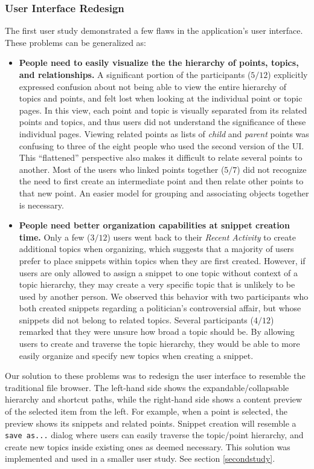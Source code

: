 \documentclass{sig-alt-release2}
\begin{document}
\subsubsection{User Interface Redesign}
The first user study demonstrated a few flaws in the application's user interface. These problems can be generalized as:
\begin{itemize}
	\item \textbf{People need to easily visualize the the hierarchy of points, topics, and relationships.} A significant portion of the participants ($5/12$) explicitly expressed confusion about not being able to view the entire hierarchy of topics and points, and felt lost when looking at the individual point or topic pages. In this view, each point and topic is visually separated from its related points and topics, and thus users did not understand the significance of these individual pages. Viewing related points as lists of {\it child} and {\it parent} points was confusing to three of the eight people who used the second version of the UI. This ``flattened'' perspective also makes it difficult to relate several points to another. Most of the users who linked points together ($5/7$) did not recognize the need to first create an intermediate point and then relate other points to that new point. An easier model for grouping and associating objects together is necessary.
	\item \textbf{People need better organization capabilities at snippet creation time.} Only a few ($3/12$) users went back to their {\it Recent Activity} to create additional topics when organizing, which suggests that a majority of users prefer to place snippets within topics when they are first created. However, if users are only allowed to assign a snippet to one topic without context of a topic hierarchy, they may create a very specific topic that is unlikely to be used by another person. We observed this behavior with two participants who both created snippets regarding a politician's controversial affair, but whose snippets did not belong to related topics. Several participants ($4/12$) remarked that they were unsure how broad a topic should be. By allowing users to create and traverse the topic hierarchy, they would be able to more easily organize and specify new topics when creating a snippet.
\end{itemize}

Our solution to these problems was to redesign the user interface to resemble the traditional file browser. The left-hand side shows the expandable/collapsable hierarchy and shortcut paths, while the right-hand side shows a content preview of the selected item from the left. For example, when a point is selected, the preview shows its snippets and related points. Snippet creation will resemble a \texttt{save as...} dialog where users can easily traverse the topic/point hierarchy, and create new topics inside existing ones as deemed necessary.
This solution was implemented and used in a smaller user study. See section \ref{secondstudy}.
\end{document}
